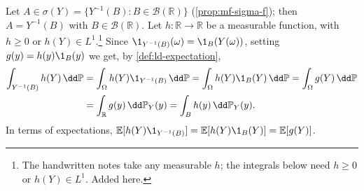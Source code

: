 \begin{remark}\label{rem:ce-discrete-property}
Let $A\in\sigma(Y)=\{Y^{-1}(B):B\in\mathcal B(\mathbb R)\}$ (\cref{prop:mf-sigma-f}); then
$A=Y^{-1}(B)$ with $B\in\mathcal B(\mathbb R)$. Let $h:\mathbb R\to\mathbb R$ be a measurable
function, with $h\ge0$ or $h(Y)\in L^1$.\footnote{The handwritten notes take any measurable
$h$; the integrals below need $h\ge0$ or $h(Y)\in L^1$. Added here.} Since
$\1_{Y^{-1}(B)}(\omega)=\1_B(Y(\omega))$, setting $g(y)=h(y)\1_B(y)$ we get, by
\cref{def:ld-expectation},
\begin{equation}\label{eq:ce-preimage}
\begin{aligned}
  \int_{Y^{-1}(B)}h(Y)\,\dd\mathbb P&=\int_\Omega h(Y)\1_{Y^{-1}(B)}\,\dd\mathbb P
  =\int_\Omega h(Y)\1_B(Y)\,\dd\mathbb P=\int_\Omega g(Y)\,\dd\mathbb P\\
  &=\int_{\mathbb R}g(y)\,\dd\mathbb P_Y(y)=\int_Bh(y)\,\dd\mathbb P_Y(y).
\end{aligned}
\end{equation}
In terms of expectations, $\mathbb E[h(Y)\1_{Y^{-1}(B)}]=\mathbb E[h(Y)\1_B(Y)]=\mathbb E[g(Y)]$.


\end{remark}
